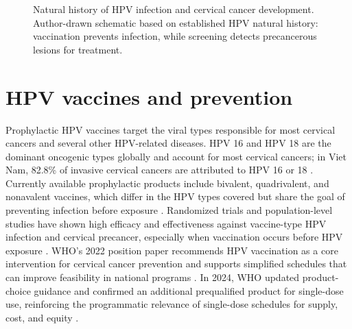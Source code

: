 \begin{figure}[H]
\centering
{}
\caption{Natural history of HPV infection and cervical cancer development. Author-drawn schematic based on established HPV natural history: vaccination prevents infection, while screening detects precancerous lesions for treatment.}
\label{fig:hpv_natural_history}
\end{figure}

\section{HPV vaccines and prevention}

Prophylactic HPV vaccines target the viral types responsible for most cervical cancers and several other HPV-related diseases. HPV 16 and HPV 18 are the dominant oncogenic types globally and account for most cervical cancers; in Viet Nam, 82.8\% of invasive cervical cancers are attributed to HPV 16 or 18 \cite{hpvcentre2023vietnam}. Currently available prophylactic products include bivalent, quadrivalent, and nonavalent vaccines, which differ in the HPV types covered but share the goal of preventing infection before exposure \cite{who2024productchoice}. Randomized trials and population-level studies have shown high efficacy and effectiveness against vaccine-type HPV infection and cervical precancer, especially when vaccination occurs before HPV exposure \cite{lei2020,drolet2019}. WHO's 2022 position paper recommends HPV vaccination as a core intervention for cervical cancer prevention and supports simplified schedules that can improve feasibility in national programs \cite{who2022hpv}. In 2024, WHO updated product-choice guidance and confirmed an additional prequalified product for single-dose use, reinforcing the programmatic relevance of single-dose schedules for supply, cost, and equity \cite{who2024productchoice,who2024singledose}.

